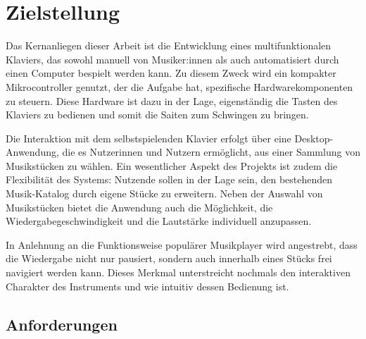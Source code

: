 
\chapter{Zielstellung} \label{Zielstellung}

\nocite{*}


Das Kernanliegen dieser Arbeit ist die Entwicklung eines multifunktionalen Klaviers,
das sowohl manuell von Musiker:innen als auch automatisiert durch einen Computer bespielt werden kann.
Zu diesem Zweck wird ein kompakter Mikrocontroller genutzt, der die Aufgabe hat, spezifische Hardwarekomponenten zu steuern.
Diese Hardware ist dazu in der Lage, eigenständig die Tasten des Klaviers zu bedienen und somit die Saiten zum Schwingen zu bringen.

Die Interaktion mit dem selbstspielenden Klavier erfolgt über eine Desktop-Anwendung, die es Nutzerinnen und Nutzern ermöglicht,
aus einer Sammlung von Musikstücken zu wählen.
Ein wesentlicher Aspekt des Projekts ist zudem die Flexibilität des Systems: Nutzende sollen in der Lage sein,
den bestehenden Musik-Katalog durch eigene Stücke zu erweitern.
Neben der Auswahl von Musikstücken bietet die Anwendung auch die Möglichkeit,
die Wiedergabegeschwindigkeit und die Lautstärke individuell anzupassen.

In Anlehnung an die Funktionsweise populärer Musikplayer wird angestrebt,
dass die Wiedergabe nicht nur pausiert, sondern auch innerhalb eines Stücks frei navigiert werden kann.
Dieses Merkmal unterstreicht nochmals den interaktiven Charakter des Instruments und wie intuitiv dessen Bedienung ist.

\section{Anforderungen} \label{sec:zielstellung-anforderungen}

